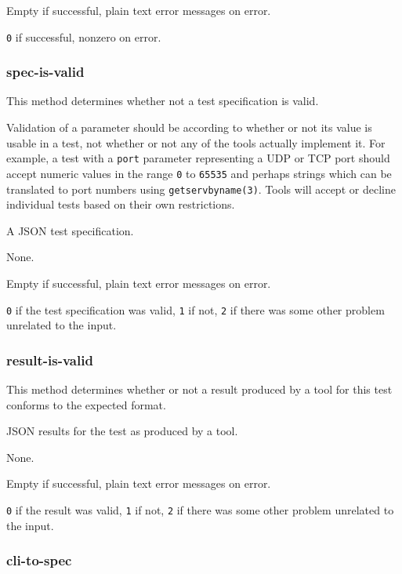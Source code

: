 \documentclass[10pt,titlepage]{article}
\begin{document}
 Empty if successful, plain text error
messages on error.

 {\tt 0} if successful, nonzero on error.



\subsubsection{spec-is-valid}
This method determines whether not a test specification is valid.

Validation of a parameter should be according to whether or not its
value is usable in a test, not whether or not any of the tools
actually implement it.  For example, a test with a {\tt port}
parameter representing a UDP or TCP port should accept numeric values
in the range {\tt 0} to {\tt 65535} and perhaps strings which can be
translated to port numbers using {\tt getservbyname(3)}.  Tools will
accept or decline individual tests based on their own restrictions.

 A JSON test specification.

 None.

 Empty if successful, plain text error
messages on error.

 {\tt 0} if the test specification was valid,
            {\tt 1} if not, {\tt 2} if there was some other problem
            unrelated to the input.



\subsubsection{result-is-valid}
This method determines whether or not a result produced by a tool for
this test conforms to the expected format.

 JSON results for the test as produced by
a tool.

 None.

 Empty if successful, plain text error
messages on error.

 {\tt 0} if the result was valid, {\tt 1} if
not, {\tt 2} if there was some other problem unrelated to the input.



\subsubsection{cli-to-spec}
\end{document}
